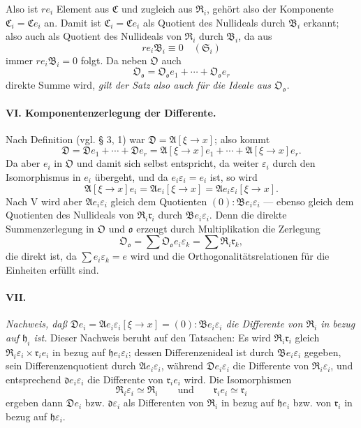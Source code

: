 Also ist $r e_i$ Element aus $\mathfrak C$ und zugleich aus $\mathfrak R_i$, gehört also der Komponente $\mathfrak C_i=\mathfrak C e_i$ an. Damit ist $\mathfrak C_i=\mathfrak C e_i$ als Quotient des Nullideals durch $\mathfrak B_i$ erkannt; also auch als Quotient des Nullideals von $\mathfrak R_i$ durch $\mathfrak B_i$, da aus
\[
r e_i\mathfrak B_i\equiv0\quad(\mathfrak S_i)
\]
immer $r e_i\mathfrak B_i=0$ folgt. Da neben $\mathfrak O$ auch
\[
\mathfrak O_{\mathfrak o}=\mathfrak O_{\mathfrak o}e_1+\cdots+\mathfrak O_{\mathfrak o}e_r
\]
direkte Summe wird, \emph{gilt der Satz also auch für die Ideale aus $\mathfrak O_{\mathfrak o}$.}

\paragraph{VI. Komponentenzerlegung der Differente.}
Nach Definition (vgl. § 3, 1) war $\mathfrak D=\mathfrak A[\xi\to x]$; also kommt
\[
\mathfrak D=\mathfrak D e_1+\cdots+\mathfrak D e_r
=\mathfrak A[\xi\to x]e_1+\cdots+\mathfrak A[\xi\to x]e_r.
\]
Da aber $e_i$ in $\mathfrak O$ und damit sich selbst entspricht, da weiter $\varepsilon_i$ durch den Isomorphismus in $e_i$ übergeht, und da $e_i\varepsilon_i=e_i$ ist, so wird
\[
\mathfrak A[\xi\to x]e_i=\mathfrak A e_i[\xi\to x]
=\mathfrak A e_i\varepsilon_i[\xi\to x].
\]
Nach V wird aber $\mathfrak A e_i\varepsilon_i$ gleich dem Quotienten $(0):\mathfrak B e_i\varepsilon_i$ --- ebenso gleich dem Quotienten des Nullideals von $\mathfrak R_i\mathfrak r_i$ durch $\mathfrak B e_i\varepsilon_i$. Denn die direkte Summenzerlegung in $\mathfrak O$ und $\mathfrak o$ erzeugt durch Multiplikation die Zerlegung
\[
\mathfrak O_{\mathfrak o}=\sum\mathfrak O_{\mathfrak o}e_i\varepsilon_k
=\sum\mathfrak R_i\mathfrak r_k,
\]
die direkt ist, da $\sum e_i\varepsilon_k=e$ wird und die Orthogonalitätsrelationen für die Einheiten erfüllt sind.

\paragraph{VII.}
\emph{Nachweis, daß $\mathfrak D e_i=\mathfrak A e_i\varepsilon_i[\xi\to x]=(0):\mathfrak B e_i\varepsilon_i$ die Differente von $\mathfrak R_i$ in bezug auf $\mathfrak h_i$ ist.} Dieser Nachweis beruht auf den Tatsachen: Es wird $\mathfrak R_i\mathfrak r_i$ gleich $\mathfrak R_i\varepsilon_i\times\mathfrak r_i e_i$ in bezug auf $\mathfrak h e_i\varepsilon_i$; dessen Differenzenideal ist durch $\mathfrak B e_i\varepsilon_i$ gegeben, sein Differenzenquotient durch $\mathfrak A e_i\varepsilon_i$, während $\mathfrak D e_i\varepsilon_i$ die Differente von $\mathfrak R_i\varepsilon_i$, und entsprechend $\mathfrak d e_i\varepsilon_i$ die Differente von $\mathfrak r_i e_i$ wird. Die Isomorphismen
\[
\mathfrak R_i\varepsilon_i\simeq\mathfrak R_i
\qquad\text{und}\qquad
\mathfrak r_i e_i\simeq\mathfrak r_i
\]
ergeben dann $\mathfrak D e_i$ bzw. $\mathfrak d\varepsilon_i$ als Differenten von $\mathfrak R_i$ in bezug auf $\mathfrak h e_i$ bzw. von $\mathfrak r_i$ in bezug auf $\mathfrak h\varepsilon_i$.

